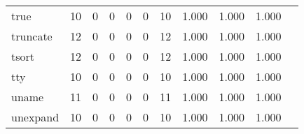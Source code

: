 \begin{longtable}{lp{1.2cm}p{1.2cm}p{1.2cm}p{1.2cm}p{1.2cm}p{1.2cm}p{1.2cm}p{1.2cm}p{1.2cm}p{1.2cm}}
true      &                                    10 &                                                  0 &                                                  0 &                                                  0 &                                                  0 &                                                 10 &                                         1.000 &                                              1.000 &                                              1.000 \\
truncate  &                                    12 &                                                  0 &                                                  0 &                                                  0 &                                                  0 &                                                 12 &                                         1.000 &                                              1.000 &                                              1.000 \\
tsort     &                                    12 &                                                  0 &                                                  0 &                                                  0 &                                                  0 &                                                 12 &                                         1.000 &                                              1.000 &                                              1.000 \\
tty       &                                    10 &                                                  0 &                                                  0 &                                                  0 &                                                  0 &                                                 10 &                                         1.000 &                                              1.000 &                                              1.000 \\
uname     &                                    11 &                                                  0 &                                                  0 &                                                  0 &                                                  0 &                                                 11 &                                         1.000 &                                              1.000 &                                              1.000 \\
unexpand  &                                    10 &                                                  0 &                                                  0 &                                                  0 &                                                  0 &                                                 10 &                                         1.000 &                                              1.000 &                                              1.000 \\

\end{longtable}
